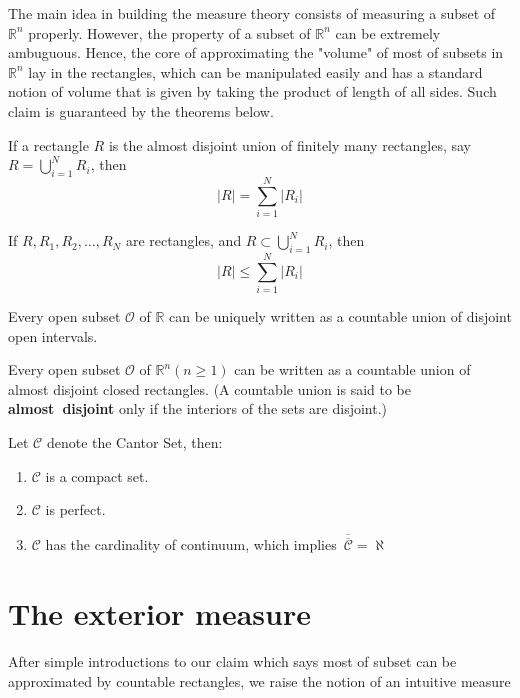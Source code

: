 \documentclass{ctexbook}
\begin{document}
The main idea in building the measure theory consists of measuring a subset of $\mathbb{R}^n$ properly. However, the property of
a subset of $\mathbb{R}^n$ can be extremely ambuguous. Hence, the core of approximating the "volume" of most of subsets in $\mathbb{R}^n$
lay in the rectangles, which can be manipulated easily and has a standard notion of volume that is given by taking the product of
length of all sides. Such claim is guaranteed by the theorems below.

\begin{lema}
    If a rectangle $R$ is the almost disjoint union of finitely many rectangles, say $R = \bigcup \limits_{i=1}^N R_i$, then
    \[\left|R\right|=\sum\limits_{i=1}^N \left|R_i\right|\]
\end{lema}
\begin{lema}
    If $R,R_1,R_2,\ldots,R_N$ are rectangles, and $R \subset \bigcup \limits_{i=1}^N R_i$, then
    \[\left|R\right|\leq\sum\limits_{i=1}^N \left|R_i\right|\]
\end{lema}

\begin{thm}
    Every open subset $\mathcal{O}$ of $\mathbb{R}$ can be uniquely written as a countable union of disjoint open intervals.
\end{thm}
\begin{thm}
    Every open subset $\mathcal{O}$ of $\mathbb{R}^n (n\geq 1)$ can be written as a countable union of almost disjoint closed
    rectangles. (A countable union is said to be \textbf{almost~disjoint} only if the interiors of the sets are disjoint.)
\end{thm}
\begin{fact}
    Let $\mathcal{C} $ denote the Cantor Set, then:
    \begin{enumerate}
        \item $\mathcal{C} $ is a compact set.
        \item $\mathcal{C} $ is perfect.
        \item $\mathcal{C} $ has the cardinality of continuum, which implies $\,\overline{\overline{\mathcal{C}}} = \aleph$
    \end{enumerate}
\end{fact}

\section{The exterior measure}

After simple introductions to our claim which says most of subset can be approximated by countable rectangles, we raise the
notion of an intuitive measure 
\end{document}
